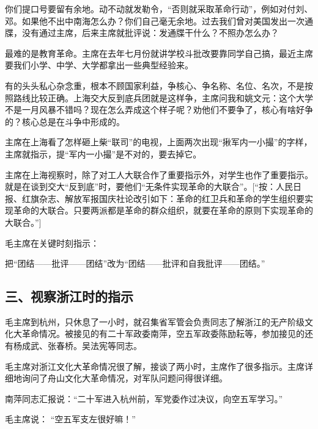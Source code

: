 你们提口号要留有余地。动不动就发勒令，“否则就采取革命行动”，例如对付刘、邓。如果他不出中南海怎么办？你们自己毫无余地。过去我们曾对美国发出一次通牒，没有通过主席，后来主席就批评说：发通牒干什么？不照办怎么办？

最难的是教育革命。主席在去年七月份就讲学校斗批改要靠同学自己搞，最近主席要我们小学、中学、大学都拿出一些典型经验来。


有的头头私心杂念重，根本不顾国家利益，争核心、争名称、名位、名次，不是按照路线比较正确。上海交大反到底兵团就是这样争，主席问我和姚文元：这个大学不是一月风暴不错吗？现在怎么弄成这个样子呢？劝他们不要争了，核心有啥好争的？核心总是在斗争中形成的。


主席在上海看了怎样砸上柴“联司”的电视，上面两次出现“揪军内一小撮”的字样，主席就指示，提“军内一小撮”是不对的，要去掉它。

主席在上海视察时，除了对工人大联合作了重要指示外，对学生也作了重要指示。就是在谈到交大“反到底”时，要他们“无条件实现革命的大联合”。[“按：人民日报、红旗杂志、解放军报国庆社论改引如下：革命的红卫兵和革命的学生组织要实现革命的大联合。只要两派都是革命的群众组织，就要在革命的原则下实现革命的大联合。”]


毛主席在关键时刻指示：

把“团结——批评——团结”改为“团结——批评和自我批评——团结。”


\subsection{三、视察浙江时的指示}

毛主席到杭州，只休息了一小时，就召集省军管会负责同志了解浙江的无产阶级文化大革命情况。被接见的有二十军政委南萍，空五军政委陈励耘等，参加接见的还有杨成武、张春桥。吴法宪等同志。

毛主席对浙江文化大革命情况很了解，接谈了两小时，主席作了很多指示。主席详细地询问了舟山文化大革命情况，对军队问题问得很详细。

南萍同志汇报说：“二十军进入杭州前，军党委作过决议，向空五军学习。”

毛主席说： “空五军支左很好嘛！”

